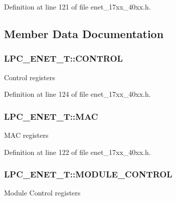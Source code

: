 Definition at line 121 of file enet\+\_\+17xx\+\_\+40xx.\+h.



\subsection{Member Data Documentation}
\subsubsection[{\texorpdfstring{C\+O\+N\+T\+R\+OL}{CONTROL}}]{ L\+P\+C\+\_\+\+E\+N\+E\+T\+\_\+\+T\+::\+C\+O\+N\+T\+R\+OL}\hypertarget{structLPC__ENET__T_a40bc06ba6a0ce4949f8a94550cfc9798}{}\label{structLPC__ENET__T_a40bc06ba6a0ce4949f8a94550cfc9798}
Control registers 

Definition at line 124 of file enet\+\_\+17xx\+\_\+40xx.\+h.

\subsubsection[{\texorpdfstring{M\+AC}{MAC}}]{ L\+P\+C\+\_\+\+E\+N\+E\+T\+\_\+\+T\+::\+M\+AC}\hypertarget{structLPC__ENET__T_a2f1d337b7206673d31a165cee9c6b1aa}{}\label{structLPC__ENET__T_a2f1d337b7206673d31a165cee9c6b1aa}
M\+AC registers 

Definition at line 122 of file enet\+\_\+17xx\+\_\+40xx.\+h.

\subsubsection[{\texorpdfstring{M\+O\+D\+U\+L\+E\+\_\+\+C\+O\+N\+T\+R\+OL}{MODULE_CONTROL}}]{ L\+P\+C\+\_\+\+E\+N\+E\+T\+\_\+\+T\+::\+M\+O\+D\+U\+L\+E\+\_\+\+C\+O\+N\+T\+R\+OL}\hypertarget{structLPC__ENET__T_a279749cd4018c81be5aa07edfe62d3e7}{}\label{structLPC__ENET__T_a279749cd4018c81be5aa07edfe62d3e7}
Module Control registers 

